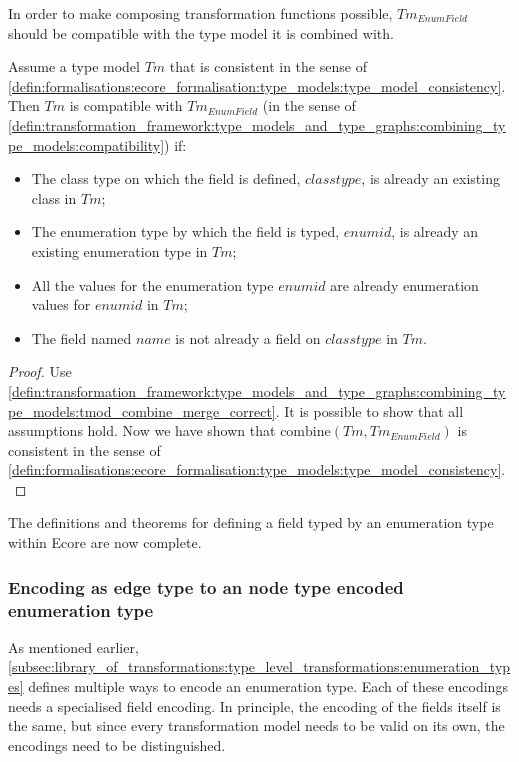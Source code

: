 In order to make composing transformation functions possible, $Tm_{EnumField}$ should be compatible with the type model it is combined with.

\begin{thm}
\label{defin:library_of_transformations:type_level_transformations:enum_fields:tmod_enum_field_combine_correct}
Assume a type model $Tm$ that is consistent in the sense of \cref{defin:formalisations:ecore_formalisation:type_models:type_model_consistency}. Then $Tm$ is compatible with $Tm_{EnumField}$ (in the sense of \cref{defin:transformation_framework:type_models_and_type_graphs:combining_type_models:compatibility}) if:
\begin{itemize}
    \item The class type on which the field is defined, $classtype$, is already an existing class in $Tm$;
    \item The enumeration type by which the field is typed, $enumid$, is already an existing enumeration type in $Tm$;
    \item All the values for the enumeration type $enumid$ are already enumeration values for $enumid$ in $Tm$;
    \item The field named $name$ is not already a field on $classtype$ in $Tm$.
\end{itemize}
\end{thm}

\begin{proof}
Use \cref{defin:transformation_framework:type_models_and_type_graphs:combining_type_models:tmod_combine_merge_correct}. It is possible to show that all assumptions hold. Now we have shown that $\mathrm{combine}(Tm, Tm_{EnumField})$ is consistent in the sense of \cref{defin:formalisations:ecore_formalisation:type_models:type_model_consistency}.
\end{proof}

The definitions and theorems for defining a field typed by an enumeration type within Ecore are now complete. 

\subsubsection{Encoding as edge type to an node type encoded enumeration type}

As mentioned earlier, \cref{subsec:library_of_transformations:type_level_transformations:enumeration_types} defines multiple ways to encode an enumeration type. Each of these encodings needs a specialised field encoding. In principle, the encoding of the fields itself is the same, but since every transformation model needs to be valid on its own, the encodings need to be distinguished. 

